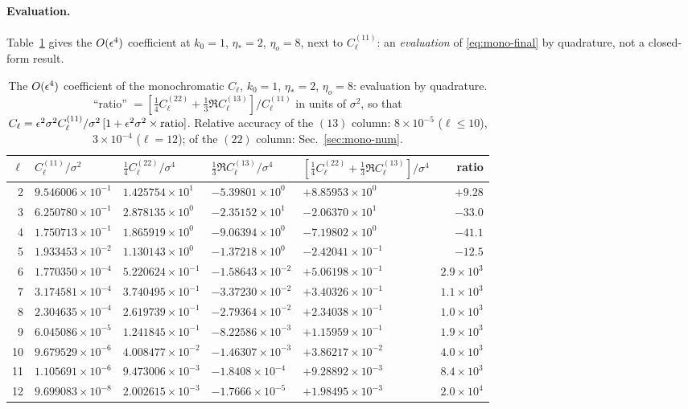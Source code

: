 \paragraph{Evaluation.}  Table~\ref{tab:mono-comb} gives the $O(\epsilon^4)$ coefficient at $k_0=1$, $\eta_*=2$, $\eta_o=8$, next to $C^{(11)}_\ell$: an
\emph{evaluation} of \eqref{eq:mono-final} by quadrature, not a closed-form result.
\begin{table}[t]
\centering\footnotesize
\setlength{\tabcolsep}{5pt}
\begin{tabular}{r|llll|r}
\hline
$\ell$ & $C^{(11)}_\ell/\sigma^2$ & $\tfrac14C^{(22)}_\ell/\sigma^4$ & $\tfrac13\Re C^{(13)}_\ell/\sigma^4$ & $[\tfrac14C^{(22)}_\ell+\tfrac13\Re C^{(13)}_\ell]/\sigma^4$ & ratio\\
\hline
2 & $9.546006{\times}10^{-1}$ & $1.425754{\times}10^{1}$ & $-5.39801{\times}10^{0}$ & $+8.85953{\times}10^{0}$ & $+9.28$\\
3 & $6.250780{\times}10^{-1}$ & $2.878135{\times}10^{0}$ & $-2.35152{\times}10^{1}$ & $-2.06370{\times}10^{1}$ & $-33.0$\\
4 & $1.750713{\times}10^{-1}$ & $1.865919{\times}10^{0}$ & $-9.06394{\times}10^{0}$ & $-7.19802{\times}10^{0}$ & $-41.1$\\
5 & $1.933453{\times}10^{-2}$ & $1.130143{\times}10^{0}$ & $-1.37218{\times}10^{0}$ & $-2.42041{\times}10^{-1}$ & $-12.5$\\
6 & $1.770350{\times}10^{-4}$ & $5.220624{\times}10^{-1}$ & $-1.58643{\times}10^{-2}$ & $+5.06198{\times}10^{-1}$ & $2.9{\times}10^{3}$\\
7 & $3.174581{\times}10^{-4}$ & $3.740495{\times}10^{-1}$ & $-3.37230{\times}10^{-2}$ & $+3.40326{\times}10^{-1}$ & $1.1{\times}10^{3}$\\
8 & $2.304635{\times}10^{-4}$ & $2.619739{\times}10^{-1}$ & $-2.79364{\times}10^{-2}$ & $+2.34038{\times}10^{-1}$ & $1.0{\times}10^{3}$\\
9 & $6.045086{\times}10^{-5}$ & $1.241845{\times}10^{-1}$ & $-8.22586{\times}10^{-3}$ & $+1.15959{\times}10^{-1}$ & $1.9{\times}10^{3}$\\
10 & $9.679529{\times}10^{-6}$ & $4.008477{\times}10^{-2}$ & $-1.46307{\times}10^{-3}$ & $+3.86217{\times}10^{-2}$ & $4.0{\times}10^{3}$\\
11 & $1.105691{\times}10^{-6}$ & $9.473006{\times}10^{-3}$ & $-1.8408{\times}10^{-4}$ & $+9.28892{\times}10^{-3}$ & $8.4{\times}10^{3}$\\
12 & $9.699083{\times}10^{-8}$ & $2.002615{\times}10^{-3}$ & $-1.7666{\times}10^{-5}$ & $+1.98495{\times}10^{-3}$ & $2.0{\times}10^{4}$\\
\hline
\end{tabular}
\caption{The $O(\epsilon^4)$ coefficient of the monochromatic $C_\ell$, $k_0=1$, $\eta_*=2$, $\eta_o=8$: evaluation by quadrature.  ``ratio'' $=
[\tfrac14C^{(22)}_\ell+\tfrac13\Re C^{(13)}_\ell]/C^{(11)}_\ell$ in units of $\sigma^2$, so that $C_\ell=\epsilon^2\sigma^2C^{(11)}_\ell/\sigma^2\,[1+\epsilon^2\sigma^2\times\text{ratio}]$.
Relative accuracy of the $(13)$ column: $8\times10^{-5}$ ($\ell\le10$), $3\times10^{-4}$ ($\ell=12$); of the $(22)$ column: Sec.~\ref{sec:mono-num}.}
\label{tab:mono-comb}
\end{table}

